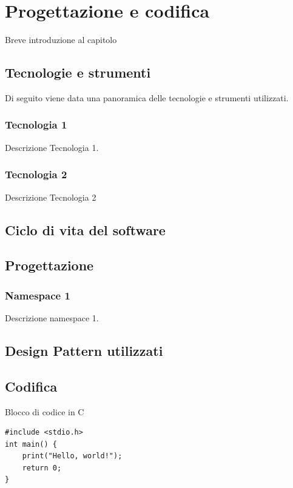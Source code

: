 \chapter{Progettazione e codifica}
\label{chap:progettazione-codifica}
Breve introduzione al capitolo

\section{Tecnologie e strumenti}
\label{sec:tecnologie-strumenti}
Di seguito viene data una panoramica delle tecnologie e strumenti utilizzati.

\subsection*{Tecnologia 1}
Descrizione Tecnologia 1.

\subsection*{Tecnologia 2}
Descrizione Tecnologia 2

\section{Ciclo di vita del software}
\label{sec:ciclo-vita-software}

\section{Progettazione}
\label{sec:progettazione}

\subsection{Namespace 1}
Descrizione namespace 1.

\section{Design Pattern utilizzati}

\section{Codifica}
Blocco di codice in C
\begin{listing}[H]
\begin{verbatim}
#include <stdio.h>
int main() {
    print("Hello, world!");
    return 0;
}
\end{verbatim}
\caption{Esempio di codice}
\label{listing:c}
\end{listing}
